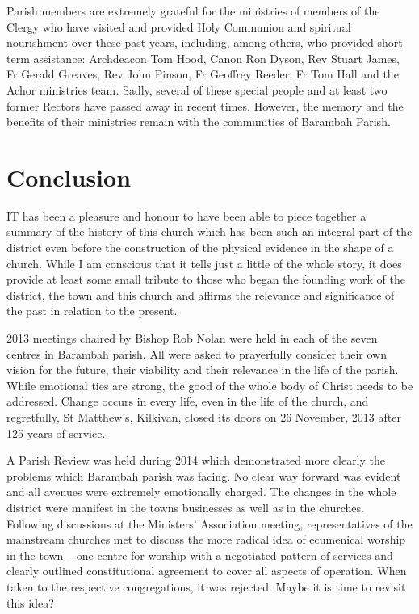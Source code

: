 Parish members are extremely grateful for the ministries of members of the Clergy who have visited and provided Holy Communion and spiritual nourishment over these past years, including, among others, who provided short term assistance: Archdeacon Tom Hood, Canon Ron Dyson, Rev Stuart James, Fr Gerald Greaves, Rev John Pinson, Fr Geoffrey Reeder. Fr Tom Hall and the Achor ministries team\emph{.} Sadly, several of these special people and at least two former Rectors have passed away in recent times. However, the memory and the benefits of their ministries remain with the communities of Barambah Parish.



\balance


\printendnotes[custom]
\setcounter{endnote}{0}
\chapter{Conclusion}
\nobalance


\lettrine[lines=3]{I}{T}
 has been a pleasure and honour to have been able to piece together a summary of the history of this church which has been such an integral part of the district even before the construction of the physical evidence in the shape of a church. While I am conscious that it tells just a little of the whole story, it does provide at least some small tribute to those who began the founding work of the district, the town and this church and affirms the relevance and significance of the past in relation to the present.

2013 meetings chaired by Bishop Rob Nolan were held in each of the seven centres in Barambah parish. All were asked to prayerfully consider their own vision for the future, their viability and their relevance in the life of the parish. While emotional ties are strong, the good of the whole body of Christ needs to be addressed. Change occurs in every life, even in the life of the church, and regretfully, St Matthew's, Kilkivan, closed its doors on 26 November, 2013 after 125 years of service.



A Parish Review was held during 2014 which demonstrated more clearly the problems which Barambah parish was facing. No clear way forward was evident and all avenues were extremely emotionally charged. The changes in the whole district were manifest in the towns businesses as well as in the churches. Following discussions at the Ministers' Association meeting, representatives of the mainstream churches met to discuss the more radical idea of ecumenical worship in the town -- one centre for worship with a negotiated pattern of services and clearly outlined constitutional agreement to cover all aspects of operation. When taken to the respective congregations, it was rejected. Maybe it is time to revisit this idea?



